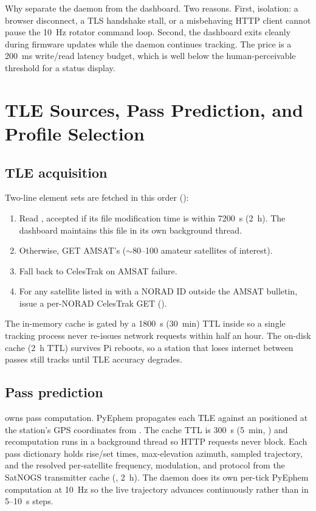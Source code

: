 Why separate the daemon from the dashboard. Two reasons. First, isolation: a browser disconnect, a TLS handshake stall, or a misbehaving HTTP client cannot pause the 10~Hz rotator command loop. Second, the dashboard exits cleanly during firmware updates while the daemon continues tracking. The price is a 200~ms write/read latency budget, which is well below the human-perceivable threshold for a status display.

\section{TLE Sources, Pass Prediction, and Profile Selection}
\label{sec:tle-and-profile}

\subsection*{TLE acquisition}

Two-line element sets are fetched in this order ():
\begin{enumerate}
    \item Read , accepted if its file modification time is within 7200~s (2~h). The dashboard maintains this file in its own background thread.
    \item Otherwise, GET AMSAT's  ($\sim$80--100 amateur satellites of interest).
    \item Fall back to CelesTrak  on AMSAT failure.
    \item For any satellite listed in  with a NORAD ID outside the AMSAT bulletin, issue a per-NORAD CelesTrak GET ().
\end{enumerate}

The in-memory cache is gated by a 1800~s (30~min) TTL inside  so a single tracking process never re-issues network requests within half an hour. The on-disk cache (2~h TTL) survives Pi reboots, so a station that loses internet between passes still tracks until TLE accuracy degrades.

\subsection*{Pass prediction}

 owns pass computation. PyEphem propagates each TLE against an  positioned at the station's GPS coordinates from . The cache TTL is 300~s (5~min, ) and recomputation runs in a background thread so HTTP requests never block. Each pass dictionary holds rise/set times, max-elevation azimuth, sampled trajectory, and the resolved per-satellite frequency, modulation, and protocol from the SatNOGS transmitter cache (, 2~h). The  daemon does its own per-tick PyEphem computation at 10~Hz so the live trajectory advances continuously rather than in 5--10~s steps.

